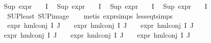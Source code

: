 \begin{isabellebody}
{\isachardoublequoteopen}Sup\ {\isacharparenleft}{\kern0pt}{\isacharparenleft}{\kern0pt}expr{\isacharunderscore}{\kern0pt}{}\ {\isasymcirc}\ {\isasymPhi}{\isacharparenright}{\kern0pt}\ {\isacharbackquote}{\kern0pt}\ I{\isacharparenright}{\kern0pt}\ {\isasymle}\ {}{\isachardoublequoteclose}\isanewline
{\isachardoublequoteopen}Sup\ {\isacharparenleft}{\kern0pt}{\isacharparenleft}{\kern0pt}expr{\isacharunderscore}{\kern0pt}{}\ {\isasymcirc}\ {\isasymPhi}{\isacharparenright}{\kern0pt}\ {\isacharbackquote}{\kern0pt}\ I{\isacharparenright}{\kern0pt}\ {\isasymle}\ {}{\isachardoublequoteclose}\isanewline
{\isachardoublequoteopen}Sup\ {\isacharparenleft}{\kern0pt}{\isacharparenleft}{\kern0pt}expr{\isacharunderscore}{\kern0pt}{}\ {\isasymcirc}\ {\isasymPhi}{\isacharparenright}{\kern0pt}\ {\isacharbackquote}{\kern0pt}\ I{\isacharparenright}{\kern0pt}\ {\isasymle}\ {}{\isachardoublequoteclose}\isanewline
{\isachardoublequoteopen}Sup\ {\isacharparenleft}{\kern0pt}{\isacharparenleft}{\kern0pt}expr{\isacharunderscore}{\kern0pt}{}\ {\isasymcirc}\ {\isasymPhi}{\isacharparenright}{\kern0pt}\ {\isacharbackquote}{\kern0pt}\ I{\isacharparenright}{\kern0pt}\ {\isasymle}\ {}{\isachardoublequoteclose}\isanewline
{}\isamarkupfalse%
\ SUP{\isacharunderscore}{\kern0pt}least\ SUP{\isacharunderscore}{\kern0pt}image\isanewline
\ \ \isamarkupfalse%
\ {\isacharparenleft}{\kern0pt}metis\ expr{\isachardot}{\kern0pt}simps\ less{\isacharunderscore}{\kern0pt}eq{\isacharunderscore}{\kern0pt}t{\isachardot}{\kern0pt}simps{\isacharparenright}{\kern0pt}{\isacharplus}{\kern0pt}\isanewline
\isanewline
\ \ \isamarkupfalse%
\ {\isachardoublequoteopen}expr{\isacharunderscore}{\kern0pt}{}\ {\isacharparenleft}{\kern0pt}hml{\isacharunderscore}{\kern0pt}conj\ I\ J\ {\isasymPhi}{\isacharparenright}{\kern0pt}\ {\isasymle}\ {}{\isachardoublequoteclose}\ {\isachardoublequoteopen}expr{\isacharunderscore}{\kern0pt}{}\ {\isacharparenleft}{\kern0pt}hml{\isacharunderscore}{\kern0pt}conj\ I\ J\ {\isasymPhi}{\isacharparenright}{\kern0pt}\ {\isasymle}\ {}{\isachardoublequoteclose}\ {\isachardoublequoteopen}expr{\isacharunderscore}{\kern0pt}{}\ {\isacharparenleft}{\kern0pt}hml{\isacharunderscore}{\kern0pt}conj\ I\ J\ {\isasymPhi}{\isacharparenright}{\kern0pt}\ {\isasymle}\ {}{\isachardoublequoteclose}\isanewline
{\isachardoublequoteopen}expr{\isacharunderscore}{\kern0pt}{}\ {\isacharparenleft}{\kern0pt}hml{\isacharunderscore}{\kern0pt}conj\ I\ J\ {\isasymPhi}{\isacharparenright}{\kern0pt}\ {\isasymle}\ {}{\isachardoublequoteclose}\ {\isachardoublequoteopen}expr{\isacharunderscore}{\kern0pt}{}\ {\isacharparenleft}{\kern0pt}hml{\isacharunderscore}{\kern0pt}conj\ I\ J\ {\isasymPhi}{\isacharparenright}{\kern0pt}\ {\isasymle}\ {}{\isachardoublequoteclose}\ {\isachardoublequoteopen}expr{\isacharunderscore}{\kern0pt}{}\ {\isacharparenleft}{\kern0pt}hml{\isacharunderscore}{\kern0pt}conj\ I\ J\ {\isasymPhi}{\isacharparenright}{\kern0pt}\ {\isasymle}\ {}{\isachardoublequoteclose}\isanewline

\end{isabellebody}
